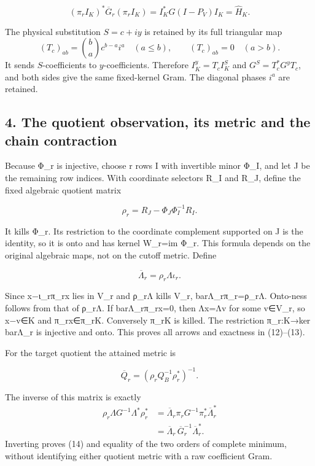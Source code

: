 \[
(\pi_rI_K)^*\overline G_r(\pi_rI_K)
=I_K^*G(I-P_V)I_K=\widehat H_K.
\]

The physical substitution \(S=c+iy\) is retained by its full triangular map \[
(T_c)_{ab}=\binom ba c^{b-a}i^a\quad(a\le b),\qquad (T_c)_{ab}=0\quad(a>b).
\] It sends \(S\)-coefficients to \(y\)-coefficients. Therefore \(I_K^y=T_cI_K^S\) and \(G^S=T_c^*G^yT_c\), and both sides give the same fixed-kernel Gram. The diagonal phases \(i^a\) are retained.

\subsection{4. The quotient observation, its metric and the chain contraction}\label{the-quotient-observation-its-metric-and-the-chain-contraction}

Because Φ\_r is injective, choose r rows I with invertible minor Φ\_I, and let J be the remaining row indices. With coordinate selectors R\_I and R\_J, define the fixed algebraic quotient matrix

\[
\rho_r=R_J-\Phi_J\Phi_I^{-1}R_I.
\]

It kills Φ\_r. Its restriction to the coordinate complement supported on J is the identity, so it is onto and has kernel W\_r=im Φ\_r. This formula depends on the original algebraic maps, not on the cutoff metric. Define

\[
\overline\Lambda_r=\rho_r\Lambda\iota_r.
\]

Since x−ι\_rπ\_rx lies in V\_r and ρ\_rΛ kills V\_r, barΛ\_rπ\_r=ρ\_rΛ. Onto-ness follows from that of ρ\_rΛ. If barΛ\_rπ\_rx=0, then Λx=Λv for some v∈V\_r, so x−v∈K and π\_rx∈π\_rK. Conversely π\_rK is killed. The restriction π\_r:K→ker barΛ\_r is injective and onto. This proves all arrows and exactness in (12)--(13).

For the target quotient the attained metric is

\[
\overline Q_r=(\rho_rQ_B^{-1}\rho_r^*)^{-1}.
\]

The inverse of this matrix is exactly \[
\begin{aligned}
\rho_r\Lambda G^{-1}\Lambda^*\rho_r^*
&=\overline\Lambda_r\pi_rG^{-1}\pi_r^*\overline\Lambda_r^*\\
&=\overline\Lambda_r\,\overline G_r^{-1}\overline\Lambda_r^* .
\end{aligned}
\] Inverting proves (14) and equality of the two orders of complete minimum, without identifying either quotient metric with a raw coefficient Gram.

